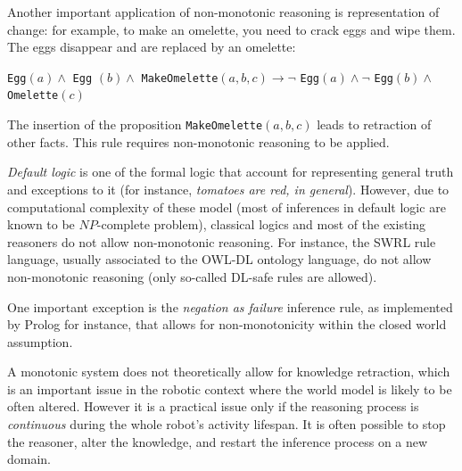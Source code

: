 \documentclass[a4paper, twocolumn]{article}
\newcommand{\concept}[1]{{\footnotesize \texttt{#1}}}
\begin{document}
Another important application of non-monotonic reasoning is representation of
change: for example, to make an omelette, you need to crack eggs and wipe them.
The eggs disappear and are replaced by an omelette:

\concept{Egg}$(a) \land $ \concept{Egg} $(b) \land $
\concept{MakeOmelette}$(a, b, c) \to \lnot $ \concept{Egg}$(a) \land \lnot $
\concept{Egg}$(b) \land $ \concept{Omelette}$(c)$

The insertion of the proposition \concept{MakeOmelette}$(a, b, c)$ leads to
retraction of other facts. This rule requires non-monotonic reasoning to be
applied.

\emph{Default logic} is one of the formal logic that account for representing
general truth and exceptions to it (for instance, \emph{tomatoes are red, in
general}). However, due to computational complexity of these model (most of
inferences in default logic are known to be $NP$-complete problem), classical
logics and most of the existing reasoners do not allow non-monotonic reasoning.
For instance, the SWRL rule language, usually associated to the OWL-DL ontology
language, do not allow non-monotonic reasoning (only so-called DL-safe rules
are allowed).


One important exception is the \emph{negation as failure} inference rule, as
implemented by {\sc Prolog} for instance, that allows for non-monotonicity
within the closed world assumption.


A monotonic system does not theoretically allow for knowledge retraction,
which is an important issue in the robotic context where the world model is
likely to be often altered.  However it is a practical issue only if the
reasoning process is \emph{continuous} during the whole robot's activity
lifespan. It is often possible to stop the reasoner, alter the knowledge, and
restart the inference process on a new domain.

\end{document}
